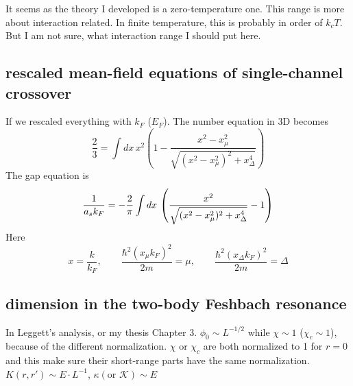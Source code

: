 It seems as the theory I developed is a zero-temperature one.  This range is more about interaction related.  In finite temperature, this is probably in order of $k_{c}T$.  But I am not sure, what interaction range I should put here. 

\subsection{rescaled mean-field equations of single-channel crossover}
If we rescaled everything with $k_{F}$ ($E_{F}$). The number equation in 3D becomes
\begin{equation}
\frac{2}{3}=\int dx\, x^{2}(1-\frac{x^{2}-x_{\mu}^{2}}{\sqrt{(x^{2}-x_{\mu}^{2})^{2}+x_{\Delta}^{4}}})
\end{equation}
The gap equation is 
\begin{equation}
\frac{1}{a_{s}k_{F}}=-\frac{2}{\pi}\int dx\,\left(\frac{x^{2}}{\sqrt{(x^{2}-x_{\mu}^{2})^{2}+x_{\Delta}^{4}}}-1\right)
\end{equation}
Here 
\begin{equation}
x=\frac{k}{k_{F}},\qquad {}
\frac{\hbar^{2}(x_{\mu}k_{F})^{2}}{2m}=\mu,\qquad
\frac{\hbar^{2}(x_{\Delta}k_{F})^{2}}{2m}=\Delta
\end{equation}


\subsection{dimension in the two-body Feshbach resonance }
In Leggett's analysis, or my thesis Chapter 3.  $\phi_{0}\sim L^{-1/2}$ while $\chi\sim 1$ ($\chi_{c}\sim1$), because of the different normalization.  $\chi$ or $\chi_{c}$ are both normalized to 1 for $r=0$ and this make sure their short-range parts have the same normalization.  $K(r,r')\sim E\cdot{L^{-1}}$, $\kappa (\text{or } \mathcal{K})\sim E$ 